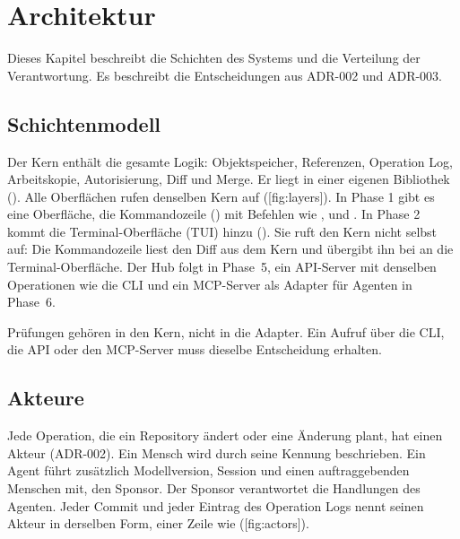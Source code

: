 \chapter[chap:architecture]{Architektur}

Dieses Kapitel beschreibt die Schichten des Systems und die Verteilung der Verantwortung.
Es beschreibt die Entscheidungen aus ADR-002 und ADR-003.

\section{Schichtenmodell}

Der Kern enthält die gesamte Logik:
Objektspeicher, Referenzen, Operation Log, Arbeitskopie, Autorisierung, Diff
und Merge.
Er liegt in einer eigenen Bibliothek ().
Alle Oberflächen rufen denselben Kern auf ([fig:layers]).
In Phase 1 gibt es eine Oberfläche, die Kommandozeile ()
mit Befehlen wie ,  und .
In Phase 2 kommt die Terminal-Oberfläche (TUI) hinzu (). Sie ruft den Kern nicht
selbst auf: Die Kommandozeile liest den Diff aus dem Kern und übergibt ihn bei 
an die Terminal-Oberfläche.
Der Hub folgt in Phase~5, ein API-Server mit denselben Operationen wie die CLI
und ein MCP-Server als Adapter für Agenten in Phase~6.

\startplacefigure[title={Schichtenmodell von Stemma},reference=fig:layers,location=here]
\stopplacefigure

Prüfungen gehören in den Kern, nicht in die Adapter. Ein Aufruf über die CLI,
die API oder den MCP-Server muss dieselbe Entscheidung erhalten.

\section{Akteure}

Jede Operation, die ein Repository ändert oder eine Änderung plant, hat einen Akteur (ADR-002).
Ein Mensch wird durch seine Kennung beschrieben.
Ein Agent führt zusätzlich Modellversion, Session und einen auftraggebenden Menschen mit,
den Sponsor.
Der Sponsor verantwortet die Handlungen des Agenten.
Jeder Commit und jeder Eintrag des Operation Logs nennt seinen Akteur in derselben Form,
einer Zeile wie  ([fig:actors]).

\startplacefigure[title={Akteur: Mensch oder Agent mit Sponsor},
    reference=fig:actors,location=here]
\stopplacefigure

